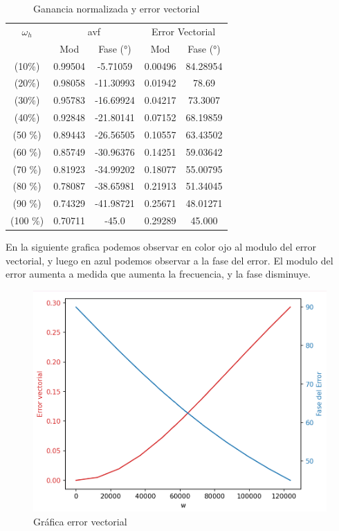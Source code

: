 \begin{table}[H]
\centering
\begin{tabular}{|c|c|c|c|c|}
\hline
\rowcolor[HTML]{3fb55b} 
$\omega_h$ & \multicolumn{2}{c|}{avf}         & \multicolumn{2}{c|}{Error Vectorial} \\ \cline{2-5} 
\rowcolor[HTML]{3fb55b}  
           & Mod & Fase (°)     &  Mod & Fase (°)  \\ \hline
 (10\%) & 0.99504 & -5.71059 &  0.00496   & 84.28954 \\ \hline
 (20\%) & 0.98058 & -11.30993 &  0.01942  & 78.69    \\ \hline
 (30\%) & 0.95783 & -16.69924 &  0.04217  & 73.3007  \\ \hline
 (40\%) & 0.92848 & -21.80141 &  0.07152  & 68.19859  \\ \hline
 (50 \%)& 0.89443 & -26.56505 &  0.10557  & 63.43502  \\ \hline
 (60 \%)& 0.85749 & -30.96376 &  0.14251  & 59.03642  \\ \hline
 (70 \%)& 0.81923 & -34.99202 &  0.18077  &  55.00795 \\ \hline
 (80 \%)& 0.78087 & -38.65981 &  0.21913  & 51.34045  \\ \hline
 (90 \%)& 0.74329 & -41.98721 &  0.25671  & 48.01271   \\ \hline
 (100 \%) &  0.70711 & -45.0    &   0.29289  & 45.000    \\ \hline 

\end{tabular}
\caption{Ganancia normalizada y error vectorial}
\label{tabla-error}
\end{table}
En la siguiente grafica podemos observar en color ojo al modulo del error vectorial, y luego en azul podemos observar a la fase del error.
El modulo del error aumenta a medida que aumenta la frecuencia, y la fase disminuye.

\begin{figure}[h!]
    \centering
    \includegraphics[width=0.80\linewidth]{img/error_vectorial.png}
    \caption{Gráfica error vectorial}
    \label{fig:errorvectorial}
\end{figure}


